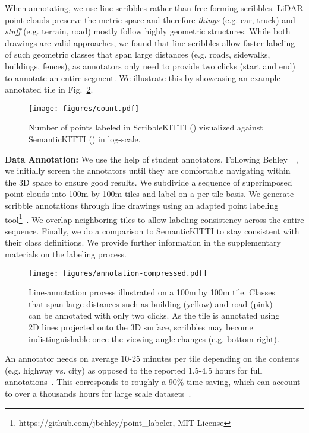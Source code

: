\documentclass[10pt,twocolumn,letterpaper]{article}
\begin{document}
When annotating, we use line-scribbles rather than free-forming scribbles. LiDAR point clouds preserve the metric space and therefore \textit{things} (e.g. car, truck) and \textit{stuff} (e.g. terrain, road) mostly follow highly geometric structures. While both drawings are valid approaches, we found that line scribbles allow faster labeling of such geometric classes that span large distances (e.g. roads, sidewalks, buildings, fences), as annotators only need to provide two clicks (start and end) to annotate an entire segment. We illustrate this by showcasing an example annotated tile in Fig.~\ref{fig:annotation_process}.

\begin{figure}[t]
    \centering
    \texttt{[image: figures/count.pdf]}
    \caption{Number of points labeled in ScribbleKITTI () visualized against SemanticKITTI () in log-scale.}
    \label{fig:count}
\end{figure}

\noindent \textbf{Data Annotation:} We use the help of student annotators. Following Behley~\etal~\cite{iccv2019semantickitti}, we initially screen the annotators until they are comfortable navigating within the 3D space to ensure good results. We subdivide a sequence of superimposed point clouds into 100m by 100m tiles and label on a per-tile basis. We generate scribble annotations through line drawings using an adapted point labeling tool\footnote{https://github.com/jbehley/point\_labeler, MIT License}~\cite{iccv2019semantickitti}. We overlap neighboring tiles to allow labeling consistency across the entire sequence. Finally, we do a comparison to SemanticKITTI to stay consistent with their class definitions.
We provide further information in the supplementary materials on the labeling process.


\begin{figure}
    \centering
    \texttt{[image: figures/annotation-compressed.pdf]}
    \caption{Line-annotation process illustrated on a 100m by 100m tile. Classes that span large distances such as building (yellow) and road (pink) can be annotated with only two clicks. As the tile is annotated using 2D lines projected onto the 3D surface, scribbles may become indistinguishable once the viewing angle changes (e.g. bottom right).}
    \label{fig:annotation_process}
\end{figure}

An annotator needs on average 10-25 minutes per tile depending on the contents (e.g. highway vs. city) as opposed to the reported 1.5-4.5 hours for full annotations~\cite{iccv2019semantickitti}. This corresponds to roughly a 90\% time saving, which can account to over a thousands hours for large scale datasets~\cite{iccv2019semantickitti}.
\end{document}

